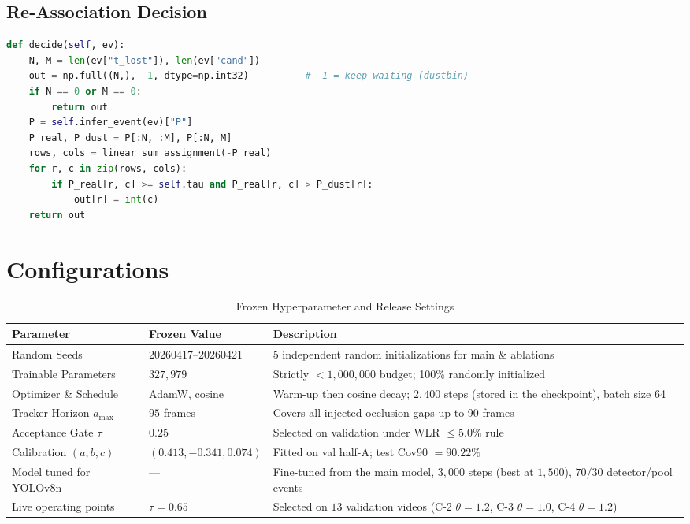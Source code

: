 \section{Re-Association Decision}
\begin{lstlisting}[language=Python, caption={Accepting a link only if it beats the threshold and the dustbin}, label={lst:decide}]
def decide(self, ev):
    N, M = len(ev["t_lost"]), len(ev["cand"])
    out = np.full((N,), -1, dtype=np.int32)          # -1 = keep waiting (dustbin)
    if N == 0 or M == 0:
        return out
    P = self.infer_event(ev)["P"]
    P_real, P_dust = P[:N, :M], P[:N, M]
    rows, cols = linear_sum_assignment(-P_real)
    for r, c in zip(rows, cols):
        if P_real[r, c] >= self.tau and P_real[r, c] > P_dust[r]:
            out[r] = int(c)
    return out
\end{lstlisting}

\chapter{Configurations}
\label{app:hyperparameters}

\begin{table}[H]
    \centering
    \caption{Frozen Hyperparameter and Release Settings}
    \label{tab:hyperparameters}
    \begin{tabularx}{\textwidth}{l l X}
        \toprule
        \textbf{Parameter} & \textbf{Frozen Value} & \textbf{Description} \\
        \midrule
        Random Seeds & 20260417--20260421 & 5 independent random initializations for main \& ablations \\
        Trainable Parameters & $327{,}979$ & Strictly $< 1{,}000{,}000$ budget; 100\% randomly initialized \\
        Optimizer \& Schedule & AdamW, cosine & Warm-up then cosine decay; $2{,}400$ steps (stored in the checkpoint), batch size 64 \\
        Tracker Horizon $a_{\max}$ & $95$ frames & Covers all injected occlusion gaps up to 90 frames \\
        Acceptance Gate $\tau$ & $0.25$ & Selected on validation under WLR $\le 5.0\%$ rule \\
        Calibration $(a, b, c)$ & $(0.413, -0.341, 0.074)$ & Fitted on val half-A; test Cov90 $= 90.22\%$ \\
        \midrule
        Model tuned for YOLOv8n & --- & Fine-tuned from the main model, $3{,}000$ steps (best at $1{,}500$), $70/30$ detector/pool events \\
        Live operating points & $\tau=0.65$ & Selected on $13$ validation videos (C-2 $\theta=1.2$, C-3 $\theta=1.0$, C-4 $\theta=1.2$) \\
        \bottomrule
    \end{tabularx}
\end{table}


